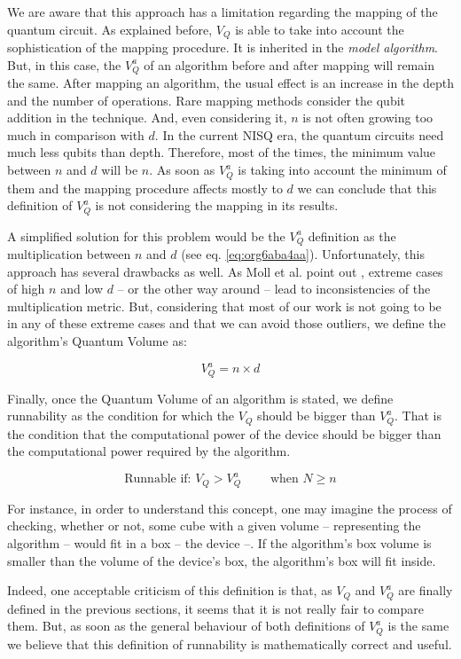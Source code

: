 We are aware that this approach has a limitation regarding the mapping of the quantum circuit.
As explained before, \(V_Q\) is able to take into account the sophistication of the mapping procedure.
It is inherited in the \emph{model algorithm}.
But, in this case, the \(V^a_Q\) of an algorithm before and after mapping will remain the same.
After mapping an algorithm, the usual effect is an increase in the depth and the number of operations.
Rare mapping methods consider the qubit addition in the technique.
And, even considering it, \(n\) is not often growing too much in comparison with \(d\).
In the current NISQ era, the quantum circuits need much less qubits than depth.
Therefore, most of the times, the minimum value between \(n\) and \(d\) will be \(n\).
As soon as \(V^a_Q\) is taking into account the minimum of them and the mapping procedure affects mostly to \(d\) we can conclude that this definition of \(V^a_Q\) is not considering the mapping in its results.

A simplified solution for this problem would be the \(V^a_Q\) definition as the multiplication between \(n\) and \(d\) (see eq. \ref{eq:org6aba4aa}).
Unfortunately, this approach has several drawbacks as well.
As Moll et al. point out \cite{Moll_2018}, extreme cases of high \(n\) and low \(d\) -- or the other way around -- lead to inconsistencies of the multiplication metric.
But, considering that most of our work is not going to be in any of these extreme cases and that we can avoid those outliers, we define the algorithm's Quantum Volume as:

\begin{equation}
\label{eq:org6aba4aa}
V_Q^a =  n \times d
\end{equation}

Finally, once the Quantum Volume of an algorithm is stated, we define runnability as the condition for which the \(V_Q\) should be bigger than \(V^a_Q\).
That is the condition that the computational power of the device should be bigger than the computational power required by the algorithm.

\begin{equation}
\label{eq:runnability}
\text{Runnable if: } V_Q > V^a_Q \quad \quad \text{ when } N \ge n
\end{equation}

For instance, in order to understand this concept, one may imagine the process of checking, whether or not, some cube with a given volume -- representing the algorithm -- would fit in a box -- the device --.
If the algorithm's box volume is smaller than the volume of the device's box, the algorithm's box will fit inside.

Indeed, one acceptable criticism of this definition is that, as \(V_Q\) and \(V^a_Q\) are finally defined in the previous sections, it seems that it is not really fair to compare them.
But, as soon as the general behaviour of both definitions of \(V^a_Q\) is the same we believe that this definition of runnability is mathematically correct and useful.
